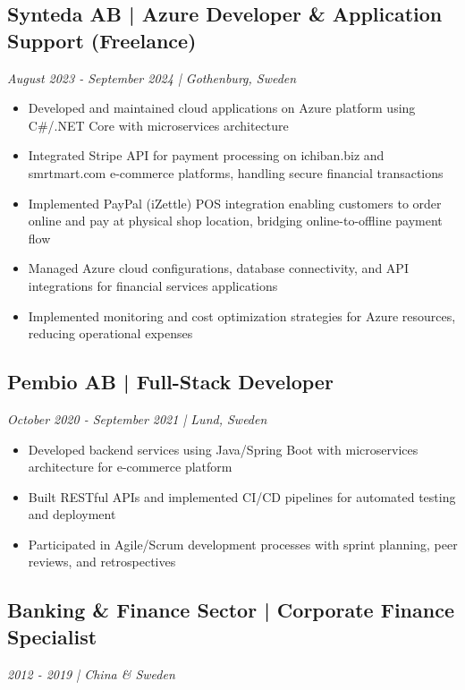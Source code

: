\documentclass[11pt,a4paper]{article}
\begin{document}
\subsection*{Synteda AB | Azure Developer \& Application Support (Freelance)}
\textit{August 2023 - September 2024 | Gothenburg, Sweden}

\begin{itemize}[leftmargin=*, itemsep=2pt]
\item Developed and maintained cloud applications on Azure platform using C\#/.NET Core with microservices architecture
\item Integrated Stripe API for payment processing on ichiban.biz and smrtmart.com e-commerce platforms, handling secure financial transactions
\item Implemented PayPal (iZettle) POS integration enabling customers to order online and pay at physical shop location, bridging online-to-offline payment flow
\item Managed Azure cloud configurations, database connectivity, and API integrations for financial services applications
\item Implemented monitoring and cost optimization strategies for Azure resources, reducing operational expenses
\end{itemize}

\subsection*{Pembio AB | Full-Stack Developer}
\textit{October 2020 - September 2021 | Lund, Sweden}

\begin{itemize}[leftmargin=*, itemsep=2pt]
\item Developed backend services using Java/Spring Boot with microservices architecture for e-commerce platform
\item Built RESTful APIs and implemented CI/CD pipelines for automated testing and deployment
\item Participated in Agile/Scrum development processes with sprint planning, peer reviews, and retrospectives
\end{itemize}

\subsection*{Banking \& Finance Sector | Corporate Finance Specialist}
\textit{2012 - 2019 | China \& Sweden}
\end{document}
